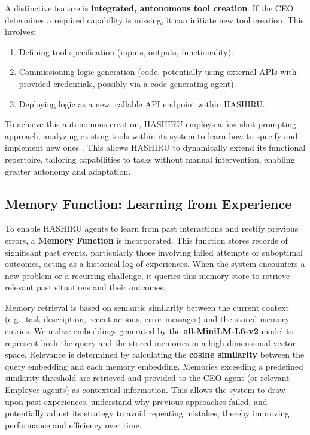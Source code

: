 \documentclass[conference]{IEEEtran}
\begin{document}
A distinctive feature is \textbf{integrated, autonomous tool creation}. If the CEO determines a required capability is missing, it can initiate new tool creation. This involves:
\begin{enumerate}
    \item Defining tool specification (inputs, outputs, functionality).
    \item Commissioning logic generation (code, potentially using external APIs with provided credentials, possibly via a code-generating agent).
    \item Deploying logic as a new, callable API endpoint within HASHIRU.
\end{enumerate}
To achieve this autonomous creation, HASHIRU employs a few-shot prompting approach, analyzing existing tools within its system to learn how to specify and implement new ones \cite{brown2020language}.
This allows HASHIRU to dynamically extend its functional repertoire, tailoring capabilities to tasks without manual intervention, enabling greater autonomy and adaptation.

\subsection{Memory Function: Learning from Experience}
\label{subsec:memory}

To enable HASHIRU agents to learn from past interactions and rectify previous errors, a \textbf{Memory Function} is incorporated. This function stores records of significant past events, particularly those involving failed attempts or suboptimal outcomes, acting as a historical log of experiences. When the system encounters a new problem or a recurring challenge, it queries this memory store to retrieve relevant past situations and their outcomes.

Memory retrieval is based on semantic similarity between the current context (e.g., task description, recent actions, error messages) and the stored memory entries. We utilize embeddings generated by the \textbf{all-MiniLM-L6-v2} model \cite{wang2020minilmdeepselfattentiondistillation} to represent both the query and the stored memories in a high-dimensional vector space. Relevance is determined by calculating the \textbf{cosine similarity} between the query embedding and each memory embedding. Memories exceeding a predefined similarity threshold are retrieved and provided to the CEO agent (or relevant Employee agents) as contextual information. This allows the system to draw upon past experiences, understand why previous approaches failed, and potentially adjust its strategy to avoid repeating mistakes, thereby improving performance and efficiency over time.
\end{document}
